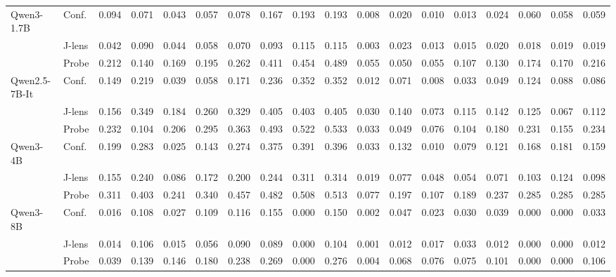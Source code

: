 \begin{table}[H]
\begin{tabular}{ll cccccccc cccccccc}
Qwen3-1.7B & Conf. & 0.094 & 0.071 & 0.043 & 0.057 & 0.078 & 0.167 & 0.193 & 0.193 & 0.008 & 0.020 & 0.010 & 0.013 & 0.024 & 0.060 & 0.058 & 0.059 \\
 & J-lens & 0.042 & 0.090 & 0.044 & 0.058 & 0.070 & 0.093 & 0.115 & 0.115 & 0.003 & 0.023 & 0.013 & 0.015 & 0.020 & 0.018 & 0.019 & 0.019 \\
 & Probe & 0.212 & 0.140 & 0.169 & 0.195 & 0.262 & 0.411 & 0.454 & 0.489 & 0.055 & 0.050 & 0.055 & 0.107 & 0.130 & 0.174 & 0.170 & 0.216 \\
\addlinespace
Qwen2.5-7B-It & Conf. & 0.149 & 0.219 & 0.039 & 0.058 & 0.171 & 0.236 & 0.352 & 0.352 & 0.012 & 0.071 & 0.008 & 0.033 & 0.049 & 0.124 & 0.088 & 0.086 \\
 & J-lens & 0.156 & 0.349 & 0.184 & 0.260 & 0.329 & 0.405 & 0.403 & 0.405 & 0.030 & 0.140 & 0.073 & 0.115 & 0.142 & 0.125 & 0.067 & 0.112 \\
 & Probe & 0.232 & 0.104 & 0.206 & 0.295 & 0.363 & 0.493 & 0.522 & 0.533 & 0.033 & 0.049 & 0.076 & 0.104 & 0.180 & 0.231 & 0.155 & 0.234 \\
\addlinespace
Qwen3-4B & Conf. & 0.199 & 0.283 & 0.025 & 0.143 & 0.274 & 0.375 & 0.391 & 0.396 & 0.033 & 0.132 & 0.010 & 0.079 & 0.121 & 0.168 & 0.181 & 0.159 \\
 & J-lens & 0.155 & 0.240 & 0.086 & 0.172 & 0.200 & 0.244 & 0.311 & 0.314 & 0.019 & 0.077 & 0.048 & 0.054 & 0.071 & 0.103 & 0.124 & 0.098 \\
 & Probe & 0.311 & 0.403 & 0.241 & 0.340 & 0.457 & 0.482 & 0.508 & 0.513 & 0.077 & 0.197 & 0.107 & 0.189 & 0.237 & 0.285 & 0.285 & 0.285 \\
\addlinespace
Qwen3-8B & Conf. & 0.016 & 0.108 & 0.027 & 0.109 & 0.116 & 0.155 & 0.000 & 0.150 & 0.002 & 0.047 & 0.023 & 0.030 & 0.039 & 0.000 & 0.000 & 0.033 \\
 & J-lens & 0.014 & 0.106 & 0.015 & 0.056 & 0.090 & 0.089 & 0.000 & 0.104 & 0.001 & 0.012 & 0.017 & 0.033 & 0.012 & 0.000 & 0.000 & 0.012 \\
 & Probe & 0.039 & 0.139 & 0.146 & 0.180 & 0.238 & 0.269 & 0.000 & 0.276 & 0.004 & 0.068 & 0.076 & 0.075 & 0.101 & 0.000 & 0.000 & 0.106 \\
\bottomrule
\end{tabular}
\end{table}
